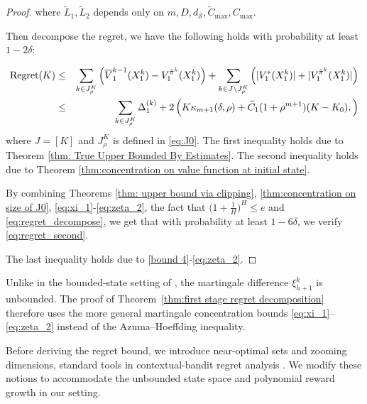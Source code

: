 \documentclass[final,supplement]{siamart251216}
\begin{document}
\begin{proof}
where $\widetilde{L}_{1}, \widetilde{L}_{2}$ depends only on $m, D, d_{\mathcal{S}},\widetilde{C}_{\max}, C_{\max}$. 


Then decompose the regret, we have the following holds with probability at least $1-2\delta$:

\begin{eqnarray}\label{eq:regret_decompose}
{\rm Regret}(K)
&\leq&
\sum_{k\in J_{\rho}^{K}}
\left(\overline{V}_{1}^{k-1}(X_{1}^{k})
-V_{1}^{\tilde{\pi}^{k}}(X_{1}^{k})\right)
+\sum_{k\in J\backslash J_{\rho}^{K}}
\left(|V_{1}^{*}(X_1^k)|
+|V_{1}^{\tilde{\pi}^{k}}(X_1^k)|\right)
\\
&\leq&
\sum_{k\in J_{\rho}^{K}}\Delta_{1}^{(k)}
+2\left(
K\kappa_{m+1}(\delta,\rho)
+\widetilde{C}_{1}
(1+\rho^{m+1})(K-K_{0}),
\right)\nonumber
\end{eqnarray}
where $J=[K]$ and $J_{\rho}^{K}$ is defined in \eqref{eq:J0}.
The first inequality holds due to Theorem \ref{thm: True Upper Bounded By Estimates}. The second inequality holds due to Theorem \ref{thm:concentration on value function at initial state}. 

By combining Theorems \ref{thm: upper bound via clipping}, \ref{thm:concentration on size of J0}, \eqref{eq:xi_1}-\eqref{eq:zeta_2},   the fact that $\Big(1+\frac{1}{H}\Big)^{H}\leq e$ and \eqref{eq:regret_decompose}, we get that with probability at least $1-6\delta$, we verify \eqref{eq:regret_second}.




The last inequality holds due to \eqref{bound 4}-\eqref{eq:zeta_2}.
\end{proof}

Unlike in the bounded-state setting of \cite{sinclair2023adaptive}, the
martingale difference $\xi_{h+1}^k$ is unbounded. The proof of
Theorem~\ref{thm:first stage regret decomposition} therefore uses the more
general martingale concentration bounds
\eqref{eq:xi_1}--\eqref{eq:zeta_2} instead of the Azuma--Hoeffding inequality.

Before deriving the regret bound, we introduce near-optimal sets and zooming
dimensions, standard tools in contextual-bandit regret analysis
\cite{sinclair2023adaptive}. We modify these notions to accommodate the
unbounded state space and polynomial reward growth in our setting.
\end{document}

